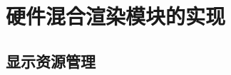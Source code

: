 \begin{minipage}{0.45\textwidth}
  \begin{algorithm}[H]
    \SetAlgoLined
    \caption{测试代码示例3}
    \label{algo:algorithm4}
  \end{algorithm}
\end{minipage}
\hfill
\begin{minipage}{0.45\textwidth}
  \begin{algorithm}[H]
    \SetAlgoLined
    \caption{测试代码示例4}
    \label{algo:algorithm5}
  \end{algorithm}
\end{minipage}




\section{硬件混合渲染模块的实现}

\subsection{显示资源管理}

